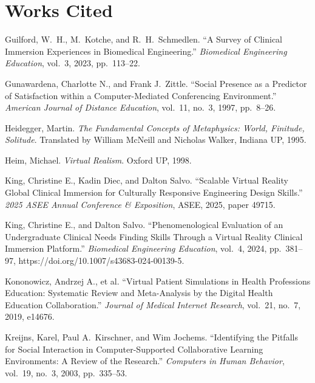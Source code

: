 \documentclass{article}
\newenvironment{workscited}
  {\section*{Works Cited}\begin{list}{}
    {\setlength{\itemindent}{-0.5in}\setlength{\leftmargin}{0.5in}
     \setlength{\itemsep}{0pt}\setlength{\parsep}{6pt}}}
  {\end{list}}
\begin{document}
\begin{workscited}
\item Guilford, W.\ H., M.\ Kotche, and R.\ H.\ Schmedlen. ``A Survey of
Clinical Immersion Experiences in Biomedical Engineering.''
\textit{Biomedical Engineering Education}, vol.~3, 2023, pp.~113--22.

\item Gunawardena, Charlotte N., and Frank J.\ Zittle. ``Social Presence
as a Predictor of Satisfaction within a Computer-Mediated Conferencing
Environment.'' \textit{American Journal of Distance Education}, vol.~11,
no.~3, 1997, pp.~8--26. %

\item Heidegger, Martin. \textit{The Fundamental Concepts of Metaphysics:
World, Finitude, Solitude}. Translated by William McNeill and Nicholas
Walker, Indiana UP, 1995. %

\item Heim, Michael. \textit{Virtual Realism}. Oxford UP, 1998.

\item King, Christine E., Kadin Diec, and Dalton Salvo. ``Scalable
Virtual Reality Global Clinical Immersion for Culturally Responsive
Engineering Design Skills.'' \textit{2025 ASEE Annual Conference \&
Exposition}, ASEE, 2025, paper 49715.

\item King, Christine E., and Dalton Salvo. ``Phenomenological Evaluation
of an Undergraduate Clinical Needs Finding Skills Through a Virtual
Reality Clinical Immersion Platform.'' \textit{Biomedical Engineering
Education}, vol.~4, 2024, pp.~381--97,
https://doi.org/10.1007/s43683-024-00139-5. %

\item Kononowicz, Andrzej A., et al. ``Virtual Patient Simulations in
Health Professions Education: Systematic Review and Meta-Analysis by the
Digital Health Education Collaboration.'' \textit{Journal of Medical
Internet Research}, vol.~21, no.~7, 2019, e14676. %

\item Kreijns, Karel, Paul A.\ Kirschner, and Wim Jochems. ``Identifying
the Pitfalls for Social Interaction in Computer-Supported Collaborative
Learning Environments: A Review of the Research.'' \textit{Computers in
Human Behavior}, vol.~19, no.~3, 2003, pp.~335--53. %


\end{workscited}
\end{document}
